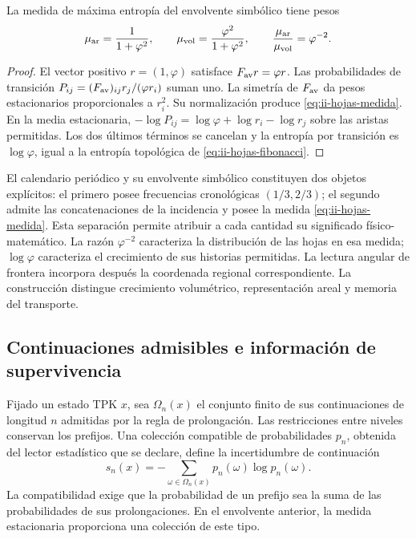 \begin{proposition}
La medida de máxima entropía del envolvente simbólico tiene pesos
\begin{equation}
 \mu_{\rm ar}=\frac{1}{1+\varphi^2},\qquad
 \mu_{\rm vol}=\frac{\varphi^2}{1+\varphi^2},\qquad
 \frac{\mu_{\rm ar}}{\mu_{\rm vol}}=\varphi^{-2}.
 \label{eq:ii-hojas-medida}
\end{equation}
\end{proposition}
\begin{proof}
El vector positivo \(r=(1,\varphi)\) satisface
\(F_{\rm av}r=\varphi r\). Las probabilidades de transición
\(P_{ij}=(F_{\rm av})_{ij}r_j/(\varphi r_i)\) suman uno.
La simetría de \(F_{\rm av}\) da pesos estacionarios proporcionales
a \(r_i^2\). Su normalización produce
\eqref{eq:ii-hojas-medida}. En la media estacionaria,
\(-\log P_{ij}=\log\varphi+\log r_i-\log r_j\) sobre las
aristas permitidas. Los dos últimos términos se cancelan y la
entropía por transición es \(\log\varphi\), igual a la entropía
topológica de \eqref{eq:ii-hojas-fibonacci}.
\end{proof}

El calendario periódico y su envolvente simbólico constituyen dos
objetos explícitos: el primero posee frecuencias cronológicas
\((1/3,2/3)\); el segundo admite las concatenaciones de la incidencia
y posee la medida \eqref{eq:ii-hojas-medida}. Esta separación permite
atribuir a cada cantidad su significado físico-matemático. La razón
\(\varphi^{-2}\) caracteriza la distribución de las hojas en esa
medida; \(\log\varphi\) caracteriza el crecimiento de sus historias
permitidas. La lectura angular de frontera incorpora después la
coordenada regional correspondiente. La construcción distingue
crecimiento volumétrico, representación areal y memoria del transporte.

\subsection{Continuaciones admisibles e información de supervivencia}
\label{sec:ii-informacion-supervivencia}

Fijado un estado TPK \(x\), sea \(\Omega_n(x)\) el conjunto finito
de sus continuaciones de longitud \(n\) admitidas por la regla de
prolongación. Las restricciones entre niveles conservan los prefijos.
Una colección compatible de probabilidades \(p_n\), obtenida del
lector estadístico que se declare, define la incertidumbre de
continuación
\begin{equation}
 s_n(x)=-\sum_{\omega\in\Omega_n(x)}
                 p_n(\omega)\log p_n(\omega).
 \label{eq:ii-entropia-continuaciones}
\end{equation}
La compatibilidad exige que la probabilidad de un prefijo sea la suma
de las probabilidades de sus prolongaciones. En el envolvente anterior,
la medida estacionaria proporciona una colección de este tipo.


